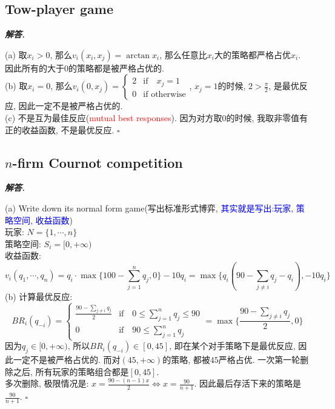 \documentclass[10pt, a4paper, oneside]{ctexart}
\newenvironment{solution}{%
  \par\noindent\textbf{\textit{解答. }}\ignorespaces
}{%
  \hfill\ensuremath{\square}\par %
}
\begin{document}
\subsection{Tow-player game}
\begin{solution}
(a) 取$x_i>0$, 那么$v_i(x_i,x_j)=\arctan x_i$, 那么任意比$x_i$大的策略都严格占优$x_i$. 因此所有的大于$0$的策略都是被严格占优的.\\
(b) 取$x_i=0$, 那么$v_i(0,x_j)=\begin{cases}
    2& \text{if} \quad x_j=1\\
    0 & \text{if otherwise}
\end{cases}$, $x_j=1$的时候, $2>\frac{\pi}{2}$, 是最优反应, 因此一定不是被严格占优的.\\
(c) 不是互为最佳反应(\textcolor{red}{mutual best responses}). 因为对方取$0$的时候, 我取非零值有正的收益函数, 不是最优反应.
\end{solution}

\subsection{\texorpdfstring{$n$-firm Cournot competition}{n-firm Cournot competition}}


\begin{solution}
(a) Write down its normal form game(写出标准形式博弈, \textcolor{blue}{其实就是写出:玩家, 策略空间, 收益函数})\\
玩家: $N=\{1,\cdots,n\}$\\
策略空间: $S_i=[0,+\infty)$\\
收益函数: 
$$v_i(q_1,\cdots,q_n)=q_i\cdot\max\{100-\sum_{j=1}^nq_j,0\}-10q_i=\max\{q_i(90-\sum_{j\neq i}q_j -q_i), -10q_i\}$$
(b) 计算最优反应: 
$$BR_i(q_{-i})=\begin{cases}
    \frac{90-\sum_{j\neq i}q_j}{2}&\text{if} \quad 0\leq \sum_{j=1}^n q_j \leq 90\\
    0&\text{if} \quad  90\leq \sum_{j=1}^n q_j 
\end{cases}=\max\{\frac{90-\sum_{j\neq i}q_j}{2},0\}$$
因为$q_j\in [0,+\infty)$, 所以$BR_i(q_{-i})\in [0,45]$, 即在某个对手策略下是最优反应, 因此一定不是被严格占优的. 而对$(45,+\infty)$的策略, 都被$45$严格占优. 一次第一轮删除之后, 所有玩家的策略组合都是$[0,45]$.\\
多次删除, 极限情况是: $x=\frac{90-(n-1)x}{2}\iff x=\frac{90}{n+1}$. 因此最后存活下来的策略是$\frac{90}{n+1}$.
\end{solution}
\end{document}
